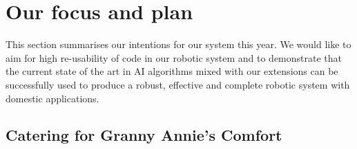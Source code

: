  
\section{Our focus and plan}

This section summarises our intentions for our system this year. We would like to aim for high re-usability of code in our robotic system and to demonstrate that the current state of the art in AI algorithms mixed with our extensions can be successfully used to produce a robust, effective and complete robotic system with domestic applications.  

\subsection{Catering for Granny Annie’s Comfort}





